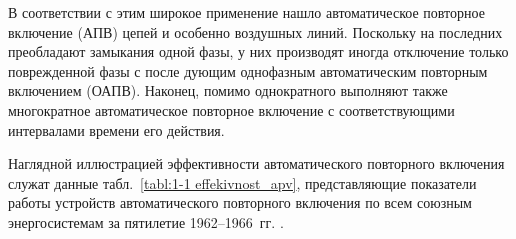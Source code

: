 В соответствии с этим широкое применение нашло автоматическое повторное включение (АПВ) цепей и особенно воздушных линий. Поскольку на последних преобладают замыкания одной фазы, у них производят иногда отключение только поврежденной фазы с после дующим однофазным автоматическим повторным включением (ОАПВ). Наконец, помимо однократного выполняют также многократное автоматическое повторное включение с соответствующими интервалами времени его действия.

Наглядной иллюстрацией эффективности автоматического повторного включения служат данные табл.~\ref{tabl:1-1 effekivnost_apv}, представляющие показатели работы устройств автоматического повторного включения по всем союзным энергосистемам за пятилетие 1962--1966~гг. \cite{Zeilndzon69}.


